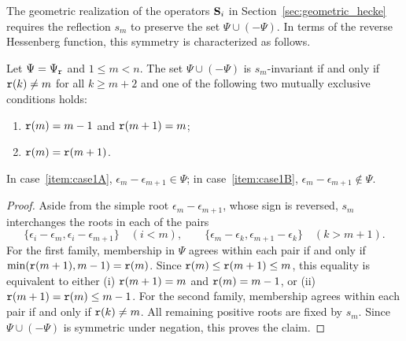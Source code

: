 The geometric realization of the operators $\mathbf S_i$ in Section~\ref{sec:geometric_hecke}
requires the reflection $s_m$ to preserve the set $\Psi\cup(-\Psi)$.
In terms of the reverse Hessenberg function, this symmetry is characterized as follows.

\begin{lemma}\label{lem:symmetry_of_root_ideal}
Let $\Psi=\Psi_{\mathtt r}$ and $1\leq m<n$.
The set $\Psi\cup(-\Psi)$ is $s_m$-invariant if and only if
$\mathtt r(k)\neq m$ for all $k\geq m+2$ and one of the following two
mutually exclusive conditions holds:
\begin{enumerate}
  \item $\mathtt r(m)=m-1$ and $\mathtt r(m+1)=m$;\label{item:case1A}
  \item $\mathtt r(m)=\mathtt r(m+1)$.\label{item:case1B}
\end{enumerate}
In case~\ref{item:case1A}, $\epsilon_m-\epsilon_{m+1}\in\Psi$;
in case~\ref{item:case1B}, $\epsilon_m-\epsilon_{m+1}\notin\Psi$.
\end{lemma}

\begin{proof}
Aside from the simple root $\epsilon_m-\epsilon_{m+1}$, whose sign is reversed,
$s_m$ interchanges the roots in each of the pairs
\[
  \{\epsilon_i-\epsilon_m,\epsilon_i-\epsilon_{m+1}\}\quad(i<m),
  \qquad
  \{\epsilon_m-\epsilon_k,\epsilon_{m+1}-\epsilon_k\}\quad(k>m+1).
\]
For the first family, membership in $\Psi$ agrees within each pair
if and only if $\min(\mathtt r(m+1),m-1)=\mathtt r(m)$.
Since $\mathtt r(m)\leq\mathtt r(m+1)\leq m$, this equality is equivalent to
either (i) $\mathtt r(m+1)=m$ and $\mathtt r(m)=m-1$, or (ii) $\mathtt r(m+1)=\mathtt r(m)\le m-1$.
For the second family, membership agrees within each pair if and only if $\mathtt r(k)\neq m$.
All remaining positive roots are fixed by $s_m$.
Since $\Psi\cup(-\Psi)$ is symmetric under negation, this proves the claim.
\end{proof}
